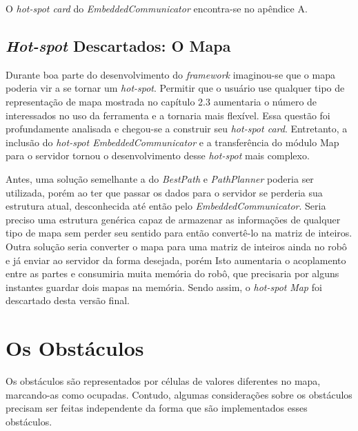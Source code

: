 O \textit{hot-spot card} do \textit{EmbeddedCommunicator} encontra-se no apêndice A.

\subsection{\textit{Hot-spot} Descartados: O Mapa}

Durante boa parte do desenvolvimento do \textit{framework} imaginou-se que o mapa poderia vir a se tornar um \textit{hot-spot}. Permitir que o usuário use qualquer tipo de representação de mapa mostrada no capítulo 2.3 aumentaria o número de interessados no uso da ferramenta e a tornaria mais flexível. Essa questão foi profundamente analisada e chegou-se a construir seu \textit{hot-spot card}. Entretanto, a inclusão do \textit{hot-spot EmbeddedCommunicator} e a transferência do módulo Map para o servidor tornou o desenvolvimento desse \textit{hot-spot} mais complexo. 

Antes, uma solução semelhante a do \textit{BestPath} e \textit{PathPlanner} poderia ser utilizada, porém ao ter que passar os dados para o servidor se perderia sua estrutura atual, desconhecida até então pelo \textit{EmbeddedCommunicator}. Seria preciso uma estrutura genérica capaz de armazenar as informações de qualquer tipo de mapa sem perder seu sentido para então convertê-lo na matriz de inteiros. Outra solução seria converter o mapa para uma matriz de inteiros ainda no robô e já enviar ao servidor da forma desejada, porém Isto aumentaria o acoplamento entre as partes e consumiria muita memória do robô, que precisaria por alguns instantes guardar dois mapas na memória. Sendo assim, o \textit{hot-spot} \textit{Map} foi descartado desta versão final.

\section{Os Obstáculos}

Os obstáculos são representados por células de valores diferentes no mapa, marcando-as como ocupadas. Contudo, algumas considerações sobre os obstáculos precisam ser feitas independente da forma que são implementados esses obstáculos.

